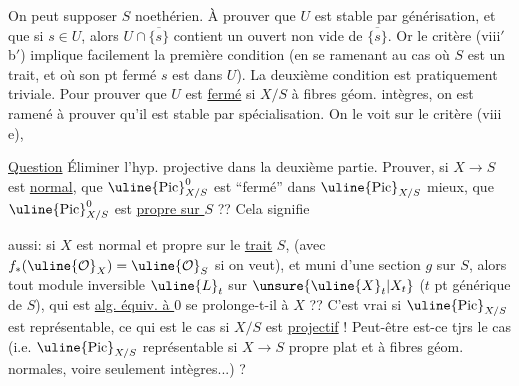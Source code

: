On peut supposer $S$ noethérien. À prouver que $U$ est stable par générisation, et que si $s\in U$, alors $U\cap\overline{\{s\}}$  contient un ouvert non vide de $\overline{\{s\}}$. Or le critère (viii$'$ b$'$) implique facilement la première condition (en se ramenant au cas où  $S$ est un trait, et où son pt fermé $s$ est dans $U$). La deuxième condition est pratiquement triviale. Pour prouver que $U$ est \uline{fermé} si $X/S$  à fibres géom. intègres, on est  ramené à prouver qu'il est stable par spécialisation. On le voit sur le critère (viii e), 

\uline{Question} Éliminer l'hyp. projective dans la deuxième partie.
Prouver, si $X\to S$ est \uline{normal}, que $\uline{\mathrm{Pic}}^0_{X/S}$ est ``fermé'' dans $\uline{\mathrm{Pic}}_{X/S}$ mieux, que $\uline{\mathrm{Pic}}^0_{X/S}$ est \uline{propre sur $S$} ?? Cela signifie

aussi: si $X$ est normal et propre sur le \uline{trait} $S$, (avec $f_*(\uline{\mathcal O}_X)=\uline{\mathcal O}_S$ si on veut), et muni d'une section $g$ sur $S$, alors tout module inversible $\uline{L}_t$ sur $\unsure{\uline{X}_t|X_t}$ ($t$ pt générique de $S$), qui est \uline{alg. équiv. à $0$} se prolonge-t-il  à $X$  ?? C'est vrai si $\uline{\mathrm{Pic}}_{X/S}$ est représentable, ce qui  est le cas si $X/S$ est \uline{projectif} ! Peut-être est-ce tjrs le cas  (i.e. $\uline{\mathrm{Pic}}_{X/S}$ représentable si $X\to S$ propre plat et à fibres géom. normales, voire seulement intègres...) ?
